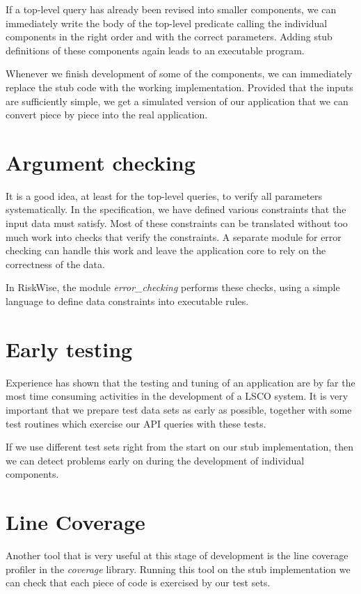 \documentclass[a4paper,12pt]{report}
\begin{document}
If a top-level query has already been revised into smaller components, we can immediately write the body of the top-level predicate calling the individual components in the right order and with the correct parameters. Adding stub definitions of these components again leads to an executable program.

Whenever we finish development of some of the components, we can immediately replace the stub code with the working implementation. Provided that the inputs are sufficiently simple, we get a simulated version of our application that we can convert piece by piece into the real application.

\section{Argument checking}
It is a good idea, at least for the top-level queries, to verify all parameters systematically. In the specification, we have defined various constraints that the input data must satisfy. Most of these constraints can be translated without too much work into checks that verify the constraints. A separate module for error checking can handle this work and leave the application core to rely on the correctness of the data.

In RiskWise, the module {\it error\_checking} performs these checks, using a simple language to define data constraints into executable rules.

\section{Early testing}
Experience has shown that the testing and tuning of an application are by far the most time consuming activities in the development of a LSCO system. It is very important that we prepare test data sets as early as possible, together with some test routines which exercise our API queries with these tests.

If we use different test sets right from the start on our stub implementation, then we can detect problems early on during the development of individual components.

\section{Line Coverage}
Another tool that is very useful at this stage of development is the line coverage profiler in the {\it coverage} library. Running this tool on the stub implementation we can check that each piece of code is exercised by our test sets.
\end{document}
